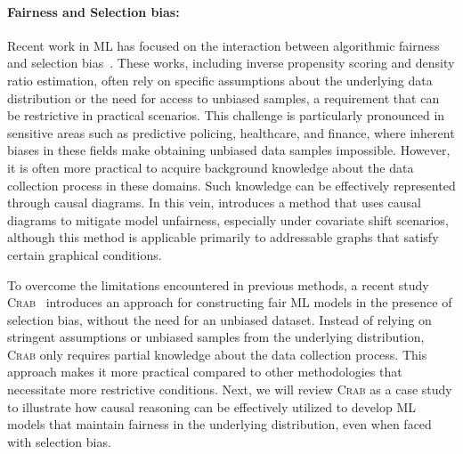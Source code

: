 \documentclass[11pt]{article}
\newcommand{\crab}{\textsc{Crab}\xspace}
\begin{document}
\vspace{-.3cm}
\paragraph{Fairness and Selection bias:}
Recent work in  ML  has focused on the interaction between algorithmic fairness and selection bias~\cite{liu2014robust,huang2006correcting,cortes2008sample,rezaei2020robust,du2021robust}. These works, including inverse propensity scoring and density ratio estimation, often rely on specific assumptions about the underlying data distribution or the need for access to unbiased samples, a requirement that can be restrictive in practical scenarios. This challenge is particularly pronounced in sensitive areas such as predictive policing, healthcare, and finance, where inherent biases in these fields make obtaining unbiased data samples impossible. However, it is often more practical to acquire background knowledge about the data collection process in these domains. Such knowledge can be effectively represented through causal diagrams. In this vein, \cite{singh2021fairness} introduces a method that uses causal diagrams to mitigate model unfairness, especially under covariate shift scenarios, although this method is applicable primarily to addressable graphs that satisfy certain graphical conditions.


To overcome the limitations encountered in previous methods, a recent study \crab~\cite{zhu2023consistent} introduces an approach for constructing fair ML models in the presence of selection bias, without the need for an unbiased dataset. Instead of relying on stringent assumptions or unbiased samples from the underlying distribution, \crab only requires partial knowledge about the data collection process. This approach makes it more practical compared to other methodologies that necessitate more restrictive conditions. Next, we will review \crab as a case study to illustrate how causal reasoning can be effectively utilized to develop ML models that maintain fairness in the underlying distribution, even when faced with selection bias.
\end{document}
